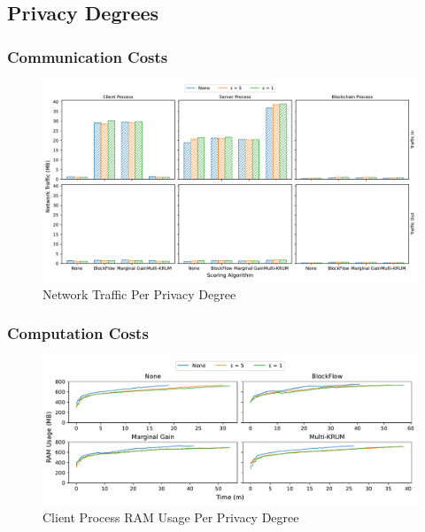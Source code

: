 \clearpage

\subsection{Privacy Degrees}

\subsubsection{Communication Costs}

\vfill

\begin{figure}[!h]
    \centering
    \includegraphics[width=\textwidth]{graphics/privacy/traffic.pdf}
    \caption{Network Traffic Per Privacy Degree}
    \label{fig:net_privacy}
\end{figure}

\vfill

\clearpage

\subsubsection{Computation Costs}

\begin{figure}[!h]
    \centering
    \includegraphics[width=\textwidth]{graphics/privacy/ram_client.pdf}
    \caption{Client Process RAM Usage Per Privacy Degree}
    \label{fig:ram_privacy_clients}
\end{figure}

